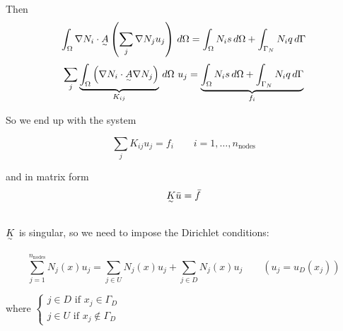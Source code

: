 Then 
\[
  \int_\Omega \nabla N_i \cdot \underset{^\sim}{A}\left(\sum_j\nabla N_ju_j\right)\,d\Omega = \int_\Omega N_is\,d\Omega + \int_{\Gamma_N}N_iq\,d\Gamma
\]
\[
  \sum_j\underbrace{\int_\Omega\left(\nabla N_i\cdot\underset{^\sim}{A}\nabla N_j\right)}_{K_{ij}}\,d\Omega \,\, u_j = \underbrace{\int_\Omega N_is\,d\Omega + \int_{\Gamma_N}N_iq\,d\Gamma}_{f_i}
\]

So we end up with the system

\[
  \sum_jK_{ij}u_j = f_i \qquad i=1,\ldots,n_{\text{nodes}}
\]

and in matrix form
\[
  \underset{^\sim}{K}\Bar{u} = \bar{f}
\]\-\\
$\underset{^\sim}{K}$ is singular, so we need to impose the Dirichlet conditions:

\[
  \sum_{j=1}^{n_{\text{nodes}}} N_j(x)u_j = \sum_{j\in U}N_j(x)u_j + \sum_{j\in D}N_j(x)u_j \qquad (u_j=u_D(x_j))
\]

where $\begin{cases}
    j\in D \text{ if } x_j \in \Gamma_D\\ j\in U \text{ if } x_j\not\in \Gamma_D
\end{cases}$

\newpage

